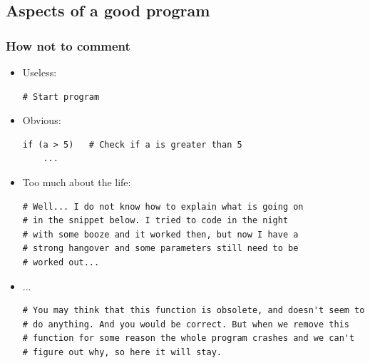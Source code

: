 \subsection*{Aspects of a good program}

\begin{frame}[fragile]
  \frametitle{How not to comment}
  \begin{itemize}[<+->]
   \item Useless:
   \begin{lstlisting}
# Start program 
   \end{lstlisting}
   \item Obvious:
   \begin{lstlisting}
if (a > 5)   # Check if a is greater than 5
    ... 
 \end{lstlisting}
   \item Too much about the life:
   \begin{lstlisting}[basicstyle=\tiny\ttfamily]
# Well... I do not know how to explain what is going on
# in the snippet below. I tried to code in the night 
# with some booze and it worked then, but now I have a 
# strong hangover and some parameters still need to be
# worked out...
   \end{lstlisting}
 
   \item ...
   \begin{lstlisting}[basicstyle=\tiny\ttfamily]
# You may think that this function is obsolete, and doesn't seem to
# do anything. And you would be correct. But when we remove this 
# function for some reason the whole program crashes and we can't 
# figure out why, so here it will stay.
   \end{lstlisting}
  \end{itemize}
 \end{frame}
 
